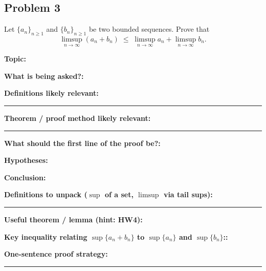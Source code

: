 \documentclass[12pt]{article}
\newcommand{\fillfield}[1]{%
  \par\noindent\textbf{#1:}\enspace\hrulefill\par\vspace{3pt}%
}
\newcommand{\fillfieldlong}[1]{%
  \par\noindent\textbf{#1:}\par\vspace{1.5cm}%
  \noindent\rule{\linewidth}{0.35pt}\par\vspace{4pt}%
}
\begin{document}
\newpage
\subsection{Problem 3}

\begin{tcolorbox}[
  enhanced, breakable,
  colback  = probblue,
  colframe = blue!55!black,
  fonttitle = \bfseries,
  title = {\textsc{Problem Statement}\hfill Homework 5, Problem 3}
]
Let $\{a_n\}_{n \geq 1}$ and $\{b_n\}_{n \geq 1}$ be two bounded sequences.
Prove that
\[
  \limsup_{n \to \infty}(a_n + b_n)
  \;\leq\;
  \limsup_{n \to \infty} a_n + \limsup_{n \to \infty} b_n.
\]
\end{tcolorbox}

\bigskip

\begin{tcolorbox}[
  enhanced, breakable,
  colback  = pass1green,
  colframe = green!55!black,
  fonttitle = \bfseries,
  title = {Pass 1 \enspace\textbf{--}\enspace First Diagnosis}
]
\fillfield{Topic}
\fillfield{What is being asked?}
\fillfieldlong{Definitions likely relevant}
\fillfieldlong{Theorem / proof method likely relevant}
\fillfield{What should the first line of the proof be?}
\end{tcolorbox}

\bigskip

\begin{tcolorbox}[
  enhanced, breakable,
  colback  = pass2yellow,
  colframe = yellow!65!black,
  fonttitle = \bfseries,
  title = {Pass 2 \enspace\textbf{--}\enspace Proof Recipe Card}
]
\fillfield{Hypotheses}
\fillfield{Conclusion}
\fillfieldlong{Definitions to unpack ($\sup$ of a set, $\limsup$ via tail sups)}
\fillfield{Useful theorem / lemma (hint: HW4)}
\fillfield{Key inequality relating $\sup\{a_n+b_n\}$ to $\sup\{a_n\}$ and $\sup\{b_n\}$:}
\fillfieldlong{One-sentence proof strategy}
\end{tcolorbox}

\bigskip
\end{document}
